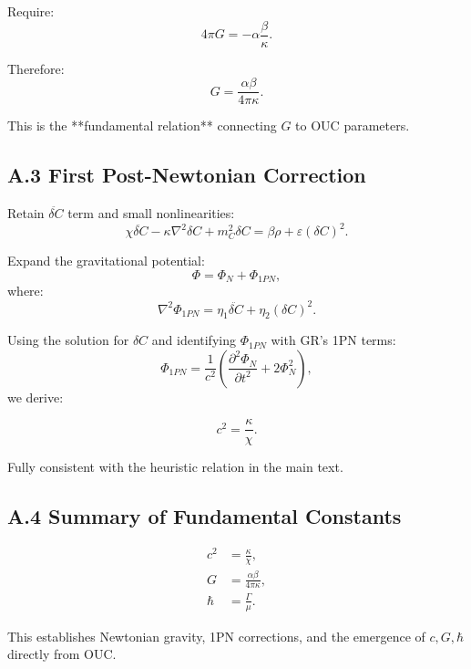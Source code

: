 Require:
\[
4\pi G = -\alpha \frac{\beta}{\kappa}.
\]

Therefore:
\[
G = \frac{\alpha \beta}{4\pi \kappa}.
\]

This is the **fundamental relation** connecting $G$ to OUC parameters.

\subsection*{A.3 First Post-Newtonian Correction}

Retain $\ddot{\delta C}$ term and small nonlinearities:
\[
\chi \ddot{\delta C}
- \kappa \nabla^2 \delta C
+ m_C^2 \delta C
= \beta \rho + \varepsilon (\delta C)^2.
\]

Expand the gravitational potential:
\[
\Phi = \Phi_N + \Phi_{1PN},
\]
where:
\[
\nabla^2 \Phi_{1PN}
= \eta_1 \ddot{\delta C}
 + \eta_2 (\delta C)^2.
\]

Using the solution for $\delta C$ and identifying $\Phi_{1PN}$ with GR's 1PN terms:
\[
\Phi_{1PN} = \frac{1}{c^2}
  \left(
      \frac{\partial^2 \Phi_N}{\partial t^2}
    + 2\Phi_N^2
  \right),
\]
we derive:

\[
c^2 = \frac{\kappa}{\chi}.
\]

Fully consistent with the heuristic relation in the main text.

\subsection*{A.4 Summary of Fundamental Constants}

\[
\boxed{
\begin{aligned}
c^2 &= \frac{\kappa}{\chi}, \\
G   &= \frac{\alpha\beta}{4\pi\kappa}, \\
\hbar &= \frac{\Gamma}{\mu}.
\end{aligned}}
\]

This establishes Newtonian gravity, 1PN corrections, and the emergence of $c,G,\hbar$ directly from OUC.
